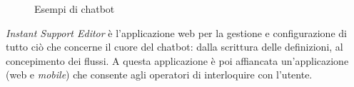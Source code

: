 \begin{figure}
    \centering
    \qquad
    \caption{Esempi di chatbot}
    \label{fig:chatbot-types}
\end{figure}

\textit{Instant Support Editor} è l'applicazione web per la gestione e configurazione di tutto ciò che concerne il cuore del chatbot: dalla scrittura delle definizioni, al concepimento dei flussi.
%
A questa applicazione è poi affiancata un'applicazione (web e \textit{mobile}) che consente agli operatori di interloquire con l'utente.

